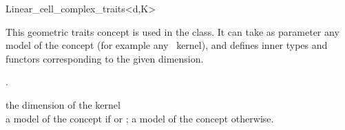 \ccRefPageBegin

\begin{ccRefClass}{Linear_cell_complex_traits<d,K>}


\ccDefinition

This geometric traits concept is used in the
 class.  It can take as parameter any model of the
concept  (for example any \cgal\ kernel), and defines inner
types and functors corresponding to the given dimension.

\ccIsModel
{}

\ccInheritsFrom
{}.

\ccParameters
{} the dimension of the kernel\\
 a model of the concept  if  or 
 ; a model of the concept  otherwise. 

\ccConstants
{}

\ccSeeAlso

\\

\end{ccRefClass}
\ccRefPageEnd
